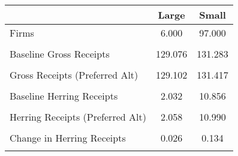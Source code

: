 \begin{tabular}{l*{2}{c}}
\hline\hline
                &    Large&    Small\\
\hline
Firms           &    6.000&   97.000\\
                &         &         \\
Baseline Gross Receipts&  129.076&  131.283\\
                &         &         \\
Gross Receipts (Preferred Alt)&  129.102&  131.417\\
                &         &         \\
Baseline Herring Receipts&    2.032&   10.856\\
                &         &         \\
Herring Receipts  (Preferred Alt)&    2.058&   10.990\\
                &         &         \\
Change in Herring Receipts&    0.026&    0.134\\
                &         &         \\
\hline\hline
\end{tabular}
